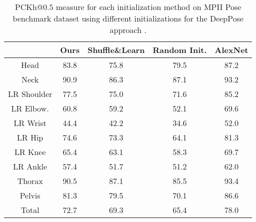 \documentclass[10pt,twocolumn,letterpaper]{article}
\begin{document}
\begin{table}[!t]
    \scriptsize
    \centering
    \begin{tabular}{|c|c|c|c||c|}
    \hline
    & Ours & Shuffle\&Learn \cite{shuffleandlearn} &  Random Init.  & AlexNet\cite{alexnet} \\
    \hline
    Head & 83.8 & 75.8 & 79.5 & 87.2 \\
    \hline
    Neck  & 90.9 & 86.3 & 87.1 & 93.2 \\
    \hline
    LR Shoulder & 77.5 & 75.0 & 71.6 & 85.2\\
    \hline
    LR Elbow. & 60.8 & 59.2 & 52.1 & 69.6\\
    \hline
    LR Wrist  & 44.4 & 42.2 & 34.6 & 52.0\\
    \hline
    LR Hip & 74.6 & 73.3 & 64.1 & 81.3\\
    \hline
    LR Knee & 65.4 & 63.1 & 58.3 & 69.7\\
    \hline
    LR Ankle & 57.4 & 51.7 & 51.2 & 62.0\\
    \hline
    Thorax & 90.5 & 87.1 & 85.5 & 93.4\\
    \hline
    Pelvis & 81.3 & 79.5 & 70.1 & 86.6\\
    \hline
    \hline
    Total & 72.7 & 69.3 & 65.4 & 78.0 \\
    \hline
    \end{tabular}
    \caption{PCKh@$0.5$ measure for each initialization method on MPII Pose benchmark dataset using different initializations for the DeepPose approach \cite{deeppose}.}
    \label{tab:results_mpii_deeppose}
\end{table}
\end{document}
